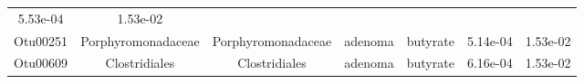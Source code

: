 \documentclass[11pt,]{article}
\begin{document}
\begin{longtable}[]{@{}ccccccc@{}}
\begin{minipage}[t]{0.09\columnwidth}
5.53e-04\strut
\end{minipage} & \begin{minipage}[t]{0.09\columnwidth}\centering\strut
1.53e-02\strut
\end{minipage}\tabularnewline
\begin{minipage}[t]{0.09\columnwidth}\centering\strut
Otu00251\strut
\end{minipage} & \begin{minipage}[t]{0.17\columnwidth}\centering\strut
Porphyromonadaceae\strut
\end{minipage} & \begin{minipage}[t]{0.17\columnwidth}\centering\strut
Porphyromonadaceae\strut
\end{minipage} & \begin{minipage}[t]{0.09\columnwidth}\centering\strut
adenoma\strut
\end{minipage} & \begin{minipage}[t]{0.11\columnwidth}\centering\strut
butyrate\strut
\end{minipage} & \begin{minipage}[t]{0.09\columnwidth}\centering\strut
5.14e-04\strut
\end{minipage} & \begin{minipage}[t]{0.09\columnwidth}\centering\strut
1.53e-02\strut
\end{minipage}\tabularnewline
\begin{minipage}[t]{0.09\columnwidth}\centering\strut
Otu00609\strut
\end{minipage} & \begin{minipage}[t]{0.17\columnwidth}\centering\strut
Clostridiales\strut
\end{minipage} & \begin{minipage}[t]{0.17\columnwidth}\centering\strut
Clostridiales\strut
\end{minipage} & \begin{minipage}[t]{0.09\columnwidth}\centering\strut
adenoma\strut
\end{minipage} & \begin{minipage}[t]{0.11\columnwidth}\centering\strut
butyrate\strut
\end{minipage} & \begin{minipage}[t]{0.09\columnwidth}\centering\strut
6.16e-04\strut
\end{minipage} & \begin{minipage}[t]{0.09\columnwidth}\centering\strut
1.53e-02\strut
\end{minipage}\tabularnewline

\end{longtable}
\end{document}

